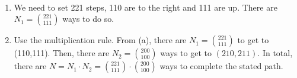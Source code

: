 
\setcounter{theorem}{7}
\begin{exercise}[BH.1.8]
\begin{solution}~
	\begin{enumerate}
		\item We need to set 221 steps, 110 are to the right and 111 are up. There are $N_{1}={221 \choose 111}$ ways to do so.
		\item Use the multiplication rule. From (a), there are $N_{1}={221 \choose 111}$ to get to (110,111). Then, there are $N_{2}={200 \choose 100}$ ways to get to $(210,211)$. In total, there are $N= N_{1}\cdot N_{2} = {221 \choose 111}\cdot {200 \choose 100}$ ways to complete the stated path.
	\end{enumerate}
\end{solution}
\end{exercise}


